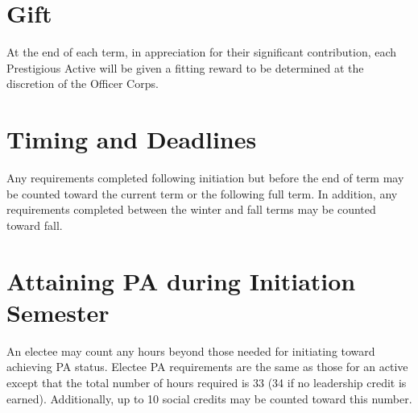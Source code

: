 \section{Gift}
At the end of each term, in appreciation for their significant contribution, each Prestigious Active will be given a fitting reward to be determined at the discretion of the Officer Corps.

\section{Timing and Deadlines}
Any requirements completed following initiation but before the end of term may be counted toward the current term or the following full term.
In addition, any requirements completed between the winter and fall terms may be counted toward fall.

\section{Attaining PA during Initiation Semester}
An electee may count any hours beyond those needed for initiating toward achieving PA status.
Electee PA requirements are the same as those for an active except that the total number of hours required is 33 (34 if no leadership credit is earned).
Additionally, up to 10 social credits may be counted toward this number.


